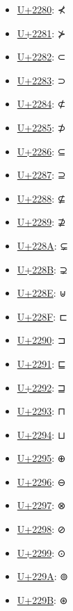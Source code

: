 \begin{itemize}
	\item \href{https://decodeunicode.org/en/u+2280}{U+2280}: ⊀
	\item \href{https://decodeunicode.org/en/u+2281}{U+2281}: ⊁
	\item \href{https://decodeunicode.org/en/u+2282}{U+2282}: ⊂
	\item \href{https://decodeunicode.org/en/u+2283}{U+2283}: ⊃
	\item \href{https://decodeunicode.org/en/u+2284}{U+2284}: ⊄
	\item \href{https://decodeunicode.org/en/u+2285}{U+2285}: ⊅
	\item \href{https://decodeunicode.org/en/u+2286}{U+2286}: ⊆
	\item \href{https://decodeunicode.org/en/u+2287}{U+2287}: ⊇
	\item \href{https://decodeunicode.org/en/u+2288}{U+2288}: ⊈
	\item \href{https://decodeunicode.org/en/u+2289}{U+2289}: ⊉
	\item \href{https://decodeunicode.org/en/u+228A}{U+228A}: ⊊
	\item \href{https://decodeunicode.org/en/u+228B}{U+228B}: ⊋
	\item \href{https://decodeunicode.org/en/u+228E}{U+228E}: ⊎
	\item \href{https://decodeunicode.org/en/u+228F}{U+228F}: ⊏
	\item \href{https://decodeunicode.org/en/u+2290}{U+2290}: ⊐
	\item \href{https://decodeunicode.org/en/u+2291}{U+2291}: ⊑
	\item \href{https://decodeunicode.org/en/u+2292}{U+2292}: ⊒
	\item \href{https://decodeunicode.org/en/u+2293}{U+2293}: ⊓
	\item \href{https://decodeunicode.org/en/u+2294}{U+2294}: ⊔
	\item \href{https://decodeunicode.org/en/u+2295}{U+2295}: ⊕
	\item \href{https://decodeunicode.org/en/u+2296}{U+2296}: ⊖
	\item \href{https://decodeunicode.org/en/u+2297}{U+2297}: ⊗
	\item \href{https://decodeunicode.org/en/u+2298}{U+2298}: ⊘
	\item \href{https://decodeunicode.org/en/u+2299}{U+2299}: ⊙
	\item \href{https://decodeunicode.org/en/u+229A}{U+229A}: ⊚
	\item \href{https://decodeunicode.org/en/u+229B}{U+229B}: ⊛

\end{itemize}
